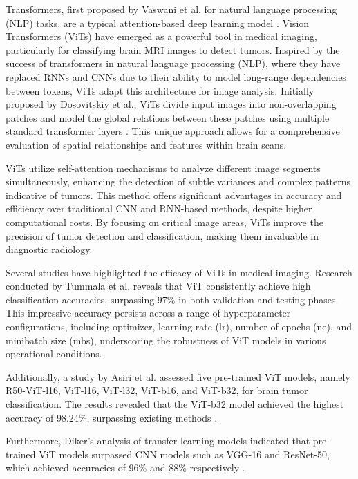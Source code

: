 Transformers, first proposed by Vaswani et al. for natural language processing (NLP) tasks, are a typical attention-based deep learning model \cite{NIPS2017_3f5ee243}. Vision Transformers (ViTs) have emerged as a powerful tool in medical imaging, particularly for classifying brain MRI images to detect tumors. Inspired by the success of transformers in natural language processing (NLP), where they have replaced RNNs and CNNs due to their ability to model long-range dependencies between tokens, ViTs adapt this architecture for image analysis. Initially proposed by Dosovitskiy et al., ViTs divide input images into non-overlapping patches and model the global relations between these patches using multiple standard transformer layers \cite{dosovitskiy2021image}. This unique approach allows for a comprehensive evaluation of spatial relationships and features within brain scans.

ViTs utilize self-attention mechanisms to analyze different image segments simultaneously, enhancing the detection of subtle variances and complex patterns indicative of tumors. This method offers significant advantages in accuracy and efficiency over traditional CNN and RNN-based methods, despite higher computational costs. By focusing on critical image areas, ViTs improve the precision of tumor detection and classification, making them invaluable in diagnostic radiology.

Several studies have highlighted the efficacy of ViTs in medical imaging. Research conducted by Tummala et al. \cite{Tummala2022} reveals that ViT consistently achieve high classification accuracies, surpassing 97\% in both validation and testing phases. This impressive accuracy persists across a range of hyperparameter configurations, including optimizer, learning rate (lr), number of epochs (ne), and minibatch size (mbs), underscoring the robustness of ViT models in various operational conditions.

Additionally, a study by Asiri et al. assessed five pre-trained ViT models, namely R50-ViT-l16, ViT-l16, ViT-l32, ViT-b16, and ViT-b32, for brain tumor classification. The results revealed that the ViT-b32 model achieved the highest accuracy of 98.24\%, surpassing existing methods \cite{Asiri2023Advancing}. 

Furthermore, Diker's analysis of transfer learning models indicated that pre-trained ViT models surpassed CNN models such as VGG-16 and ResNet-50, which achieved accuracies of 96\% and 88\% respectively \cite{Diker2021A}.

